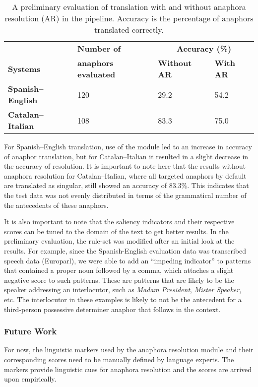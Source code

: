 \documentclass[free]{flammie}
\begin{document}
\begin{table}[ht]
\centering
\caption{A preliminary evaluation of translation with and without anaphora
    resolution (AR) in the pipeline. Accuracy is the percentage of anaphors
    translated correctly.}
\label{tab:AREval}
\begin{tabular}{llll}
\\
\midrule
& \textbf{Number of} & \multicolumn{2}{c}{\textbf{Accuracy (\%)}} \\
\textbf{Systems}&\textbf{anaphors evaluated}&\textbf{Without AR}&\textbf{With AR}\\
\midrule
\textbf{Spanish--English}&120&29.2&54.2\\
\textbf{Catalan--Italian}&108&83.3&75.0\\
\bottomrule
\end{tabular}

\end{table}

For Spanish--English translation, use of the module led to an increase in
accuracy of anaphor translation, but for Catalan--Italian it resulted in a
slight decrease in the accuracy of resolution. It is important to note here that
the results without anaphora resolution for Catalan--Italian, where all targeted
anaphors by default are translated as singular, still showed an accuracy of
83.3\%.  This indicates that the test data was not evenly distributed in terms
of the grammatical number of the antecedents of these anaphors.

It is also important to note that the saliency indicators and their respective
scores can be tuned to the domain of the text to get better results. In the
preliminary evaluation, the rule-set was modified after an initial look at the
results. For example, since the Spanish-English evaluation data was transcribed
speech data (Europarl), we were able to add an ``impeding indicator'' to
patterns that contained a proper noun followed by a comma, which attaches a
slight negative score to such patterns.  These are patterns that are likely to
be the speaker addressing an interlocutor, such as \textit{Madam President},
\textit{Mister Speaker}, etc.  The interlocutor in these examples is likely to
not be the antecedent for a third-person possessive determiner anaphor that
follows in the context.

\subsubsection{Future Work}\label{sec:ARFutureIdeas}
For now, the linguistic markers used by the anaphora resolution module and their
corresponding scores need to be manually defined by language experts.  The
markers provide linguistic cues for anaphora resolution and the scores are
arrived upon empirically.
\end{document}
